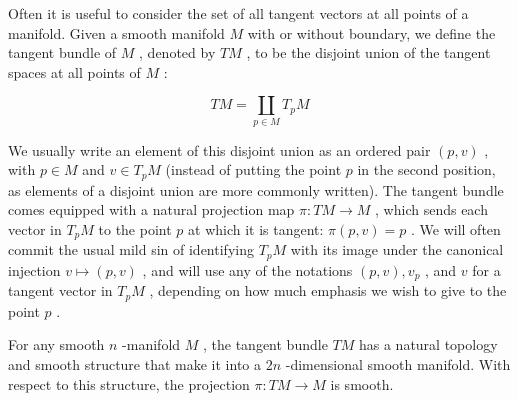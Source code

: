 \begin{definition}
\label{def:3-16-extra-1}
\mathlibok
Often it is useful to consider the set of all tangent vectors at all points of a manifold. Given a smooth manifold $M$ with or without boundary, we define the tangent bundle of $M$ , denoted by ${TM}$ , to be the disjoint union of the tangent spaces at all points of $M$ :

\[
{TM} = \mathop{\coprod }\limits_{{p \in  M}}{T}_{p}M
\]

We usually write an element of this disjoint union as an ordered pair $\left( {p, v}\right)$ , with $p \in  M$ and $v \in  {T}_{p}M$ (instead of putting the point $p$ in the second position, as elements of a disjoint union are more commonly written). The tangent bundle comes equipped with a natural projection map $\pi  : {TM} \rightarrow  M$ , which sends each vector in ${T}_{p}M$ to the point $p$ at which it is tangent: $\pi \left( {p, v}\right)  = p$ . We will often commit the usual mild sin of identifying ${T}_{p}M$ with its image under the canonical injection $v \mapsto  \left( {p, v}\right)$ , and will use any of the notations $\left( {p, v}\right) ,{v}_{p}$ , and $v$ for a tangent vector in ${T}_{p}M$ , depending on how much emphasis we wish to give to the point $p$ .
\end{definition}

\begin{proposition}
\label{prop:3-18}
\mathlibok
{}
For any smooth $n$ -manifold $M$ , the tangent bundle ${TM}$ has a natural topology and smooth structure that make it into a ${2n}$ -dimensional smooth manifold. With respect to this structure, the projection $\pi  : {TM} \rightarrow  M$ is smooth.
\end{proposition}

